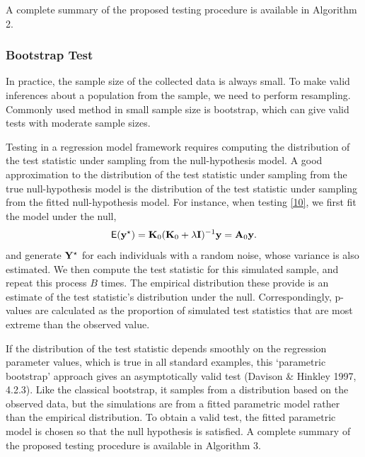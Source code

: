 \documentclass[article]{jss}
\begin{document}
A complete summary of the proposed testing procedure is available in Algorithm 2.

\subsubsection{{Bootstrap Test}}

In practice, the sample size of the collected data is always small. To make valid inferences about a population from the sample, we need to perform resampling. Commonly used method in small sample size is bootstrap, which can give valid tests with moderate sample sizes.

Testing in a regression model framework requires computing the distribution of the test statistic under sampling from the null-hypothesis model. A good approximation to the distribution of the test statistic under sampling from the true null-hypothesis model is the distribution of the test statistic under sampling from the fitted null-hypothesis model. For instance, when testing \eqref{10}, we first fit the model under the null,
\begin{align}
\mathsf{E}({\bf y}^\star)={\bf K}_0({\bf K}_0+\lambda {\bf I})^{-1}{\bf y}={\bf A}_0{\bf y}.
\end{align}
and generate ${\bf Y}^\star$ for each individuals with a random noise, whose variance is also estimated. We then compute the test statistic for this simulated sample, and repeat this process $B$ times. The empirical distribution these provide is an estimate of the test statistic's distribution under the null. Correspondingly, p-values are calculated as the proportion of simulated test statistics that are most extreme than the observed value.

If the distribution of the test statistic depends smoothly on the regression parameter values, which is true in all standard examples, this ‘parametric bootstrap’ approach gives an asymptotically valid test (Davison \& Hinkley 1997, 4.2.3). Like the classical bootstrap, it samples from a distribution based on the observed data, but the simulations are from a fitted parametric model rather than the empirical distribution. To obtain a valid test, the fitted parametric model is chosen so that the null hypothesis is satisfied.
A complete summary of the proposed testing procedure is available in Algorithm 3.

\end{document}
